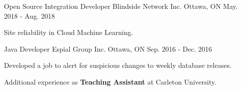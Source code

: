 \begin{cventries}

\cventry
{Open Source Integration Developer}
{Blindside Network Inc.}
{Ottawa, ON}
{May. 2018 - Aug. 2018}
{\begin{cvitems}
    \item {Site reliability in Cloud Machine Learning.}
\end{cvitems}}

\cventry
{Java Developer}
{Espial Group Inc.}
{Ottawa, ON}
{Sep. 2016 - Dec. 2016}
{\begin{cvitems}
    \item {Developed a job to alert for suspicious changes to weekly database releases.}
\end{cvitems}}

Additional experience as \textbf{Teaching Assistant} at Carleton University.
\end{cventries}
